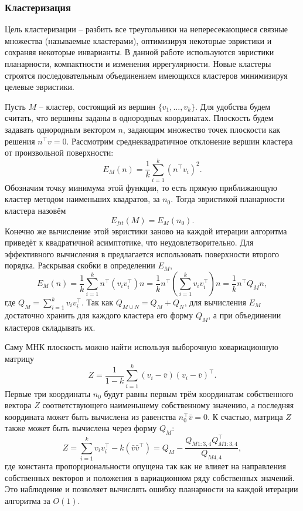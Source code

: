 \subsubsection{Кластеризация}
Цель кластеризации -- разбить все треугольники на непересекающиеся связные множества (называемые кластерами), оптимизируя некоторые эвристики и сохраняя некоторые инварианты. В данной работе используются эвристики планарности, компактности и изменения иррегулярности. Новые кластеры строятся последовательным объединением имеющихся кластеров минимизируя целевые эвристики.

Пусть $M$ -- кластер, состоящий из вершин $\{v_1, ..., v_k\}$. Для удобства будем считать, что вершины заданы в однородных координатах. Плоскость будем задавать однородным вектором $n$, задающим множество точек плоскости как решения $n^\top v = 0$. Рассмотрим среднеквадратичное отклонение вершин кластера от произвольной поверхности:
\[
  E_M(n) = \frac{1}{k}\sum_{i=1}^k (n^\top v_i)^2.
\]
Обозначим точку минимума этой функции, то есть прямую приближающую кластер методом наименьших квадратов, за $n_0$. Тогда эвристикой планарности кластера назовём
\[
  E_{fit}(M) = E_M(n_0).
\]
Конечно же вычисление этой эвристики заново на каждой итерации алгоритма приведёт к квадратичной асимптотике, что неудовлетворительно. Для эффективного вычисления в \cite{garland2001} предлагается использовать поверхности второго порядка. Раскрывая скобки в определении $E_M$,
\[
  E_M(n) = \frac{1}{k}\sum_{i=1}^k n^\top(v_iv_i^\top) n
    = \frac{1}{k}n^\top\left(\sum_{i=1}^k v_iv_i^\top\right) n
    = \frac{1}{k}n^\top Q_M n,
\]
где $Q_M = \sum_{i=1}^k v_iv_i^\top$. Так как $Q_{M\cup N} = Q_M + Q_N$, для вычисления $E_M$ достаточно хранить для каждого кластера его форму $Q_M$, а при объединении кластеров складывать их.

Саму МНК плоскость можно найти используя выборочную ковариационную матрицу
\[
  Z = \frac{1}{1-k}\sum_{i=1}^k (v_i - \bar v)(v_i - \bar v)^\top.
\]
Первые три координаты $n_0$ будут равны первым трём координатам собственного вектора $Z$ соответствующего наименьшему собственному значению, а последняя координата может быть вычислена из равенства $n_0^\top \bar v = 0$. К счастью, матрица $Z$ также может быть вычислена через форму $Q_M$:
\[
  Z = \sum_{i=1}^k v_iv_i^\top - k(\bar v \bar v^\top) = Q_M - \frac{Q_{M1:3,4}Q_{M1:3,4}^\top}{Q_{M4,4}},
\]
где константа пропорциональности опущена так как не влияет на направления собственных векторов и положения в вариационном ряду собственных значений. Это наблюдение и позволяет вычислять ошибку планарности на каждой итерации алгоритма за $O(1)$.

